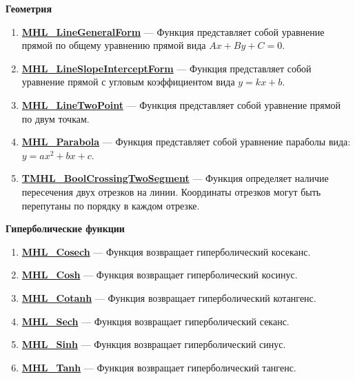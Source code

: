 \documentclass[a4paper,12pt]{article}
\begin{document}
\textbf{Геометрия}
\begin{enumerate}

\item \textbf{\hyperref[MHL_LineGeneralForm]{MHL\_LineGeneralForm}} --- Функция представляет собой уравнение прямой по общему уравнению прямой вида $Ax+By+C=0$.

\item \textbf{\hyperref[MHL_LineSlopeInterceptForm]{MHL\_LineSlopeInterceptForm}} --- Функция представляет собой уравнение прямой с угловым коэффициентом вида $y=kx+b$.

\item \textbf{\hyperref[MHL_LineTwoPoint]{MHL\_LineTwoPoint}} --- Функция представляет собой уравнение прямой по двум точкам.

\item \textbf{\hyperref[MHL_Parabola]{MHL\_Parabola}} --- Функция представляет собой уравнение параболы вида: $y=ax^2+bx+c$.

\item \textbf{\hyperref[TMHL_BoolCrossingTwoSegment]{TMHL\_BoolCrossingTwoSegment}} --- Функция определяет наличие пересечения двух отрезков на линии. Координаты отрезков могут быть перепутаны по порядку в каждом отрезке.

\end{enumerate}

\textbf{Гиперболические функции}
\begin{enumerate}

\item \textbf{\hyperref[MHL_Cosech]{MHL\_Cosech}} --- Функция возвращает гиперболический косеканс.

\item \textbf{\hyperref[MHL_Cosh]{MHL\_Cosh}} --- Функция возвращает гиперболический косинус.

\item \textbf{\hyperref[MHL_Cotanh]{MHL\_Cotanh}} --- Функция возвращает гиперболический котангенс.

\item \textbf{\hyperref[MHL_Sech]{MHL\_Sech}} --- Функция возвращает гиперболический секанс.

\item \textbf{\hyperref[MHL_Sinh]{MHL\_Sinh}} --- Функция возвращает гиперболический синус.

\item \textbf{\hyperref[MHL_Tanh]{MHL\_Tanh}} --- Функция возвращает гиперболический тангенс.

\end{enumerate}
\end{document}
